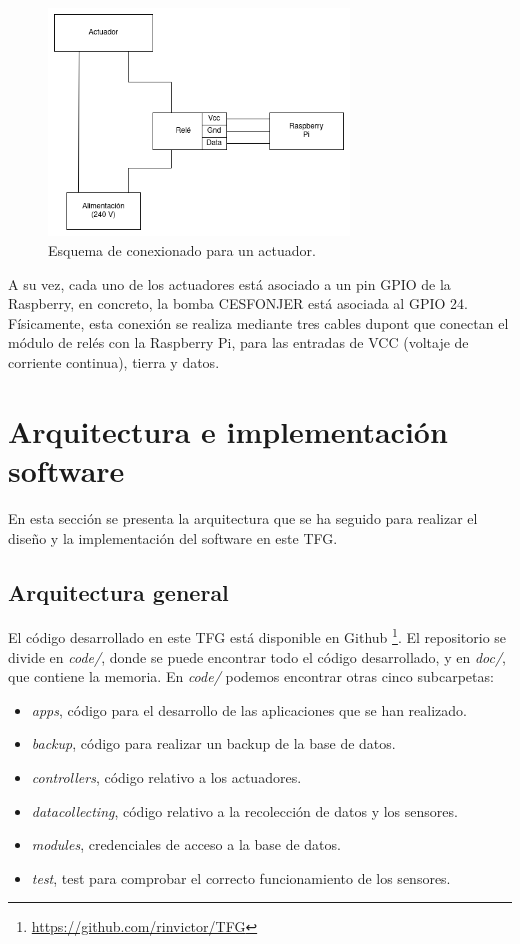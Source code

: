 \documentclass[a4paper, 12pt, oneside]{book}
\begin{document}
\begin{figure}[H]
	\centering
    \includegraphics[width=8cm, keepaspectratio]{img/circuito_reles}
    \caption{Esquema de conexionado para un actuador.}
    \label{figura:circuito_reles}
\end{figure}

A su vez, cada uno de los actuadores está asociado a un pin GPIO de la Raspberry, en concreto, la bomba CESFONJER está asociada al GPIO 24. Físicamente, esta conexión se realiza mediante tres cables dupont que conectan el módulo de relés con la Raspberry Pi, para las entradas de VCC (voltaje de corriente continua), tierra y datos.


	
\section{Arquitectura e implementación software}
\label{sec:Arquitectura e implementación software}
En esta sección se presenta la arquitectura que se ha seguido para realizar el diseño y la implementación del software en este TFG.

\subsection{Arquitectura general}
\label{subsec:arquitectura general}
El código desarrollado en este TFG está disponible en Github \footnote{\url{https://github.com/rinvictor/TFG}}. El repositorio se divide en \textit{code/}, donde se puede encontrar todo el código desarrollado, y en \textit{doc/}, que contiene la memoria.
En \textit{code/} podemos encontrar otras cinco subcarpetas:
\begin{itemize}
\item \textit{apps}, código para el desarrollo de las aplicaciones que se han realizado.
\item \textit{backup}, código para realizar un backup de la base de datos.
\item \textit{controllers}, código relativo a los actuadores.
\item \textit{datacollecting}, código relativo a la recolección de datos y los sensores.
\item \textit{modules}, credenciales de acceso a la base de datos.
\item \textit{test}, test para comprobar el correcto funcionamiento de los sensores.
\end{itemize}
\end{document}
